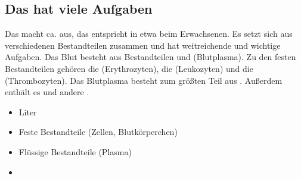 \clearpage %

\subsection{Das  hat viele Aufgaben}
\label{topic:blut}


\TextSlide{\TxBeschreibung}
{%
Das  macht ca. 
aus, das entspricht in etwa  beim
Erwachsenen. Es setzt sich aus verschiedenen Bestandteilen
zusammen und hat weitreichende und wichtige Aufgaben. 
Das Blut besteht aus
 Bestandteilen und 
(Blutplasma).
Zu
den festen Bestandteilen gehören die  (Erythrozyten), die  (Leukozyten) und die 
(Thrombozyten).
Das Blutplasma besteht zum größten Teil aus .
Außerdem enthält es  und andere .
}{
\begin{itemize}
  \item {} Liter
  \item Feste Bestandteile (Zellen, Blutkörperchen)
  \item Flüssige Bestandteile (Plasma)
  \item {}
\end{itemize}
}{}{}{}




